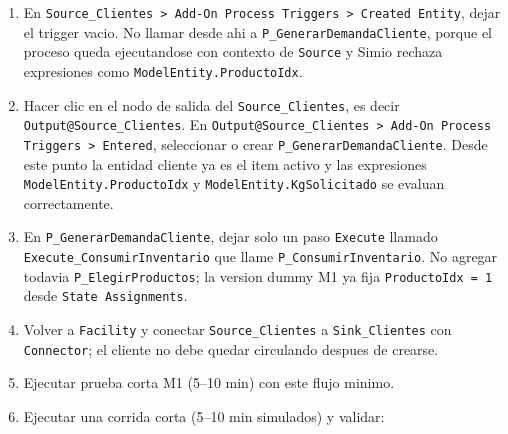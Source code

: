\documentclass[11pt]{article}
\newcommand{\simio}[1]{\texttt{#1}}
\newcommand{\state}[1]{\texttt{#1}}
\newcommand{\proc}[1]{\texttt{#1}}
\begin{document}
\begin{enumerate}
\begin{enumerate}
    \item Cerrar el popup de error.
    \item En el diagrama de \proc{P\_GenerarDemandaCliente}, seleccionar cada rectangulo gris que diga \simio{Assign} o \simio{Assign1}.
    \item Presionar \simio{Remove} en la cinta superior o la tecla \simio{Delete}. Repetir hasta que no quede ningun bloque \simio{Assign} en ese proceso.
    \item Arrastrar un paso \simio{Execute} desde \simio{Common Steps} si todavia no existe.
    \item En el panel derecho del \simio{Execute}, escribir \simio{Process Name = P\_ConsumirInventario}.
    \item El flujo minimo correcto queda: \simio{Begin -> Execute\_ConsumirInventario -> End}.
    \item Volver a \simio{Facility}, seleccionar \simio{Source\_Clientes} y verificar que las 4 filas de \simio{State Assignments} esten ahi, no dentro del proceso.
  \end{enumerate}
  \item En \simio{Source\_Clientes > Add-On Process Triggers > Created Entity}, dejar el trigger vacio. No llamar desde ahi a \proc{P\_GenerarDemandaCliente}, porque el proceso queda ejecutandose con contexto de \simio{Source} y Simio rechaza expresiones como \state{ModelEntity.ProductoIdx}.
  \item Hacer clic en el nodo de salida del \simio{Source\_Clientes}, es decir \simio{Output@Source\_Clientes}. En \simio{Output@Source\_Clientes > Add-On Process Triggers > Entered}, seleccionar o crear \proc{P\_GenerarDemandaCliente}. Desde este punto la entidad cliente ya es el item activo y las expresiones \state{ModelEntity.ProductoIdx} y \state{ModelEntity.KgSolicitado} se evaluan correctamente.
  \item En \proc{P\_GenerarDemandaCliente}, dejar solo un paso \simio{Execute} llamado \simio{Execute\_ConsumirInventario} que llame \proc{P\_ConsumirInventario}. No agregar todavia \proc{P\_ElegirProductos}; la version dummy M1 ya fija \state{ProductoIdx = 1} desde \simio{State Assignments}.
  \item Volver a \simio{Facility} y conectar \simio{Source\_Clientes} a \simio{Sink\_Clientes} con \simio{Connector}; el cliente no debe quedar circulando despues de crearse.
  \item Ejecutar prueba corta M1 (5--10 min) con este flujo minimo.
  \item Ejecutar una corrida corta (5--10 min simulados) y validar:

\end{enumerate}
\end{document}
